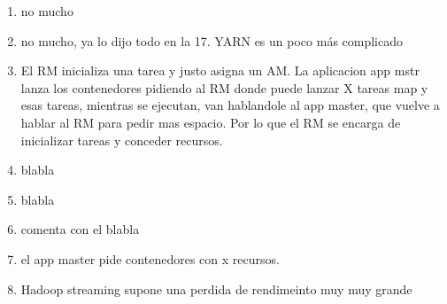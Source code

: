 \begin{enumerate}
\item no mucho
\item no mucho, ya lo dijo todo en la 17. YARN es un poco más complicado
\item El RM inicializa una tarea y justo asigna un AM. La aplicacion app mstr lanza los contenedores pidiendo al RM donde puede lanzar X tareas map y esas tareas, mientras se ejecutan, van hablandole al app master, que vuelve a hablar al RM para pedir mas espacio. Por lo que el RM se encarga de inicializar tareas y conceder recursos. 
\item blabla
\item blabla
\item comenta con el blabla
\item el app master pide contenedores con x recursos. 
\item Hadoop streaming supone una perdida de rendimeinto muy muy grande
\end{enumerate}